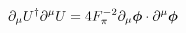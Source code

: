 \begin{equation}
\partial_{\mu} U^\dag \partial^{\mu} U = 4 F_\pi^{-2} \partial_{\mu} \mbox{\boldmath$\phi$}\cdot \partial^{\mu} \mbox{\boldmath$\phi$}
\end{equation}

